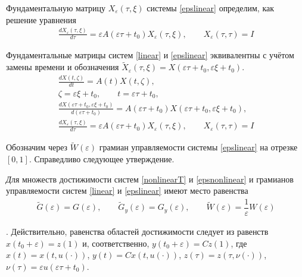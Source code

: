 \documentclass[../main.tex]{subfiles}
\begin{document}
	Фундаментальную матрицу $ X_{\varepsilon}(\tau,\xi) $ системы \eqref{epslinear} определим, как решение уравнения
\begin{gather*}
	\frac{dX_{\varepsilon}(\tau,\xi)}{d\tau} = \varepsilon A(\varepsilon \tau + t_0) X_{\varepsilon}(\tau,\xi), \qquad X_{\varepsilon}(\tau,\tau) = I
\end{gather*}

Фундаментальные матрицы систем \eqref{linear} и \eqref{epslinear} эквивалентны с учётом замены времени и обозначения $ \widetilde{X}_{\varepsilon}(\tau,\xi) = X(\varepsilon \tau + t_0,\varepsilon \xi + t_0) $.
\begin{gather*}
	\frac{dX(t,\zeta)}{dt} = A(t) X(t,\zeta), \\
	\zeta = \varepsilon \xi + t_0, \qquad t = \varepsilon \tau + t_0, \\
	\frac{dX(\varepsilon \tau + t_0,\varepsilon \xi + t_0)}{d(\varepsilon \tau + t_0)} = A(\varepsilon \tau + t_0) X(\varepsilon \tau + t_0,\varepsilon \xi + t_0), \\
	\frac{dX_{ \varepsilon}(\tau,\xi)}{d\tau} = \varepsilon A(\varepsilon \tau + t_0) X_{ \varepsilon}(\tau,\xi), \qquad X_{\varepsilon}(\tau,\tau) = I
\end{gather*}

Обозначим через $ \widetilde{W}(\varepsilon) $ грамиан управляемости системы \eqref{epslinear} на отрезке $ [0,1] $. Справедливо следующее утверждение.

\begin{utv}\label{utv}
	{\textit Для множеств достижимости систем \eqref{nonlinearT} и \eqref{epsnonlinear} и грамианов управляемости систем \eqref{linear} и \eqref{epslinear} имеют место равенства}
	\begin{gather*}
		\widetilde{G}(\varepsilon)=G(\varepsilon), \qquad \widetilde{G}_y(\varepsilon)=G_y(\varepsilon), \qquad
		\widetilde{W}(\varepsilon) = \dfrac{1}{\varepsilon} W(\varepsilon)
	\end{gather*}
\end{utv}

\doc. 
Действительно, равенства областей достижимости следует из равенств $ x(t_0 + \varepsilon) = z(1) $ и, соответственно, $ y(t_0+\varepsilon) = C z(1) $, где $ x(t) = x(t,u(\cdot)) $, $ y(t) = C x(t,u(\cdot)) $, $ z(\tau) = z(\tau,\nu(\cdot))  $, $ \nu(\tau) = \varepsilon u(\varepsilon \tau + t_0)  $.
\end{document}
